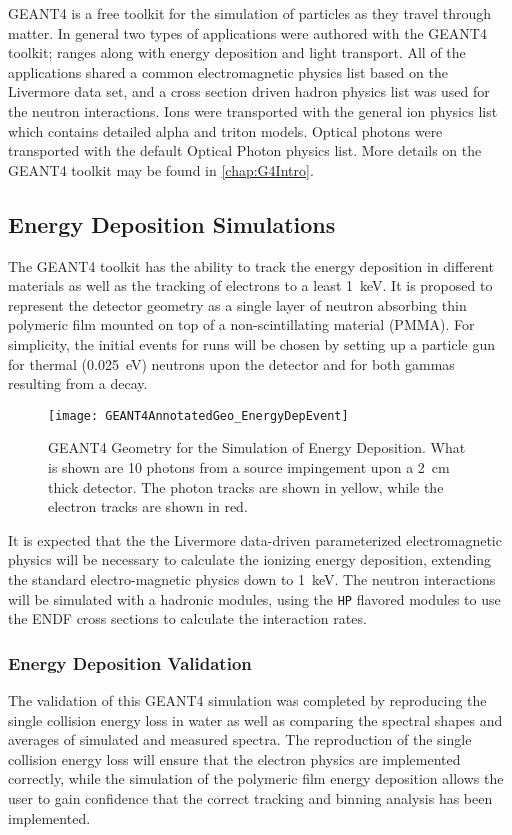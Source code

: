 GEANT4 is a free toolkit for the simulation of particles as they travel through matter\cite{agostinelli_geant4simulation_2003}.
In general two types of applications were authored with the GEANT4 toolkit; ranges along with energy deposition and light transport.
All of the applications shared a common electromagnetic physics list based on the Livermore data set, and a cross section driven hadron physics list was used for the neutron interactions.
Ions were transported with the general ion physics list which contains detailed alpha and triton models.
Optical photons were transported with the default Optical Photon physics list.
More details on the GEANT4 toolkit may be found in \autoref{chap:G4Intro}.

\subsection{Energy Deposition Simulations}
\label{sec:EnergyDeposition}
The GEANT4 toolkit has the ability to track the energy deposition in different materials as well as the tracking of electrons to a least \SI{1}{\keV}\cite{agostinelli_geant4simulation_2003}.
It is proposed to represent the detector geometry as a single layer of neutron absorbing thin polymeric film mounted on top of a non-scintillating material (PMMA).
For simplicity, the initial events for runs will be chosen by setting up a particle gun for thermal (\SI{0.025}{\eV}) neutrons upon the detector and for both gammas resulting from a  decay.
\begin{figure}
  \texttt{[image: GEANT4AnnotatedGeo\_EnergyDepEvent]}
	\caption[GEANT4 Energy Deposition Geometry]{GEANT4 Geometry for the Simulation of Energy Deposition. What is shown are 10 photons from a  source impingement upon a \SI{2}{\cm} thick detector.  The photon tracks are shown in yellow, while the electron tracks are shown in red.}
	\label{fig:EDepSimGeo}
\end{figure}
It is expected that the the Livermore data-driven parameterized electromagnetic physics will be necessary to calculate the ionizing energy deposition, extending the standard electro-magnetic physics down to \SI{1}{\kilo\eV}.
The neutron interactions will be simulated with a hadronic modules, using the \verb+HP+ flavored modules to use the ENDF cross sections to calculate the interaction rates.

\subsubsection{Energy Deposition Validation}
The validation of this GEANT4 simulation was completed by reproducing the single collision energy loss in water as well as comparing  the spectral shapes and averages of simulated and measured spectra.
The reproduction of the single collision energy loss will ensure that the electron physics are implemented correctly, while the simulation of the polymeric film energy deposition allows the user to gain confidence that the correct tracking and binning analysis has been implemented.

